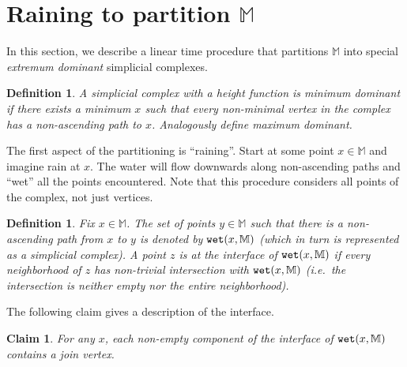 \documentclass[11pt]{article}
\newtheorem{claim}[theorem]{Claim}
\newtheorem{lemma}[theorem]{Lemma}
\newtheorem{definition}[theorem]{Definition}
\theoremstyle{definition}
\newcommand{\MM}{\mathbb{M}}
\newcommand{\wet}{{\tt wet}}
\begin{document}
% 
% 




\section{Raining to partition $\MM$} \label{sec:rain}

In this section, we describe a linear time procedure that partitions $\MM$ into special
\emph{extremum dominant} simplicial complexes.

\begin{definition} \label{def:dom} A simplicial complex with a height function is \emph{minimum dominant} if there exists
a minimum $x$ such that every non-minimal \emph{vertex} in the complex has a non-ascending path to $x$.
Analogously define \emph{maximum dominant}. 
\end{definition}

The first aspect of the partitioning is ``raining''. Start at some point $x \in \MM$ and imagine rain at $x$.
The water will flow downwards along non-ascending paths and ``wet'' all the points encountered. Note that this procedure considers all points
of the complex, not just vertices.

\begin{definition} \label{def:wet} Fix $x \in \MM$. The set of points $y \in \MM$ such that there is a non-ascending path from $x$ to $y$
is denoted by $\wet(x,\MM)$ (which in turn is represented as a simplicial complex). A point $z$ is at the \emph{interface} of $\wet(x,\MM)$ if every neighborhood of $z$
has non-trivial intersection with $\wet(x,\MM)$ (i.e.\ the intersection is neither empty nor the entire neighborhood).
\end{definition}

The following claim gives a description of the interface. 

\begin{claim} \label{clm:inter} For any $x$, each non-empty component of the interface of $\wet(x,\MM)$ contains a join vertex.
\end{claim}
\end{document}
